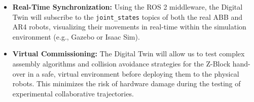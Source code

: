 \begin{itemize}
    \item \textbf{Real-Time Synchronization:} Using the ROS 2 middleware, the Digital Twin will subscribe to the \texttt{joint\_states} topics of both the real ABB and AR4 robots, visualizing their movements in real-time within the simulation environment (e.g., Gazebo or Isaac Sim).
    
    \item \textbf{Virtual Commissioning:} The Digital Twin will allow us to test complex assembly algorithms and collision avoidance strategies for the Z-Block hand-over in a safe, virtual environment before deploying them to the physical robots. This minimizes the risk of hardware damage during the testing of experimental collaborative trajectories.
\end{itemize}